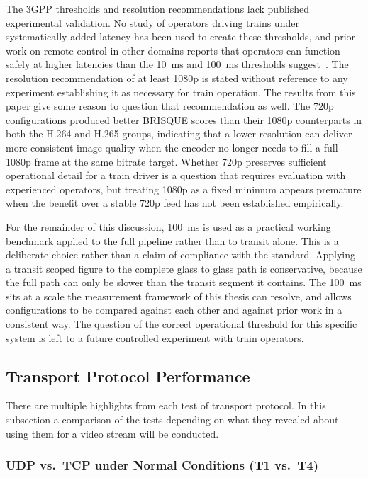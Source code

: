 The 3GPP thresholds and resolution recommendations lack published experimental validation. No study of operators driving trains under systematically added latency has been used to create these thresholds, and prior work on remote control in other domains reports that operators can function safely at higher latencies than the 10~ms and 100~ms thresholds suggest~\cite{myhrvold2025}. The resolution recommendation of at least 1080p is stated without reference to any experiment establishing it as necessary for train operation. The results from this paper give some reason to question that recommendation as well. The 720p configurations produced better BRISQUE scores than their 1080p counterparts in both the H.264 and H.265 groups, indicating that a lower resolution can deliver more consistent image quality when the encoder no longer needs to fill a full 1080p frame at the same bitrate target. Whether 720p preserves sufficient operational detail for a train driver is a question that requires evaluation with experienced operators, but treating 1080p as a fixed minimum appears premature when the benefit over a stable 720p feed has not been established empirically.

For the remainder of this discussion, 100~ms is used as a practical working benchmark applied to the full pipeline rather than to transit alone. This is a deliberate choice rather than a claim of compliance with the standard. Applying a transit scoped figure to the complete glass to glass path is conservative, because the full path can only be slower than the transit segment it contains. The 100~ms sits at a scale the measurement framework of this thesis can resolve, and allows configurations to be compared against each other and against prior work in a consistent way. The question of the correct operational threshold for this specific system is left to a future controlled experiment with train operators.

\subsection{Transport Protocol Performance }\label{subsec:disc_transport}

There are multiple highlights from each test of transport protocol. In this subsection a comparison of the tests depending on what they revealed about using them for a video stream will be conducted.

\subsubsection{UDP vs.\ TCP under Normal Conditions (T1 vs.\ T4)}\label{subsubsec:udp_vs_tcp}


